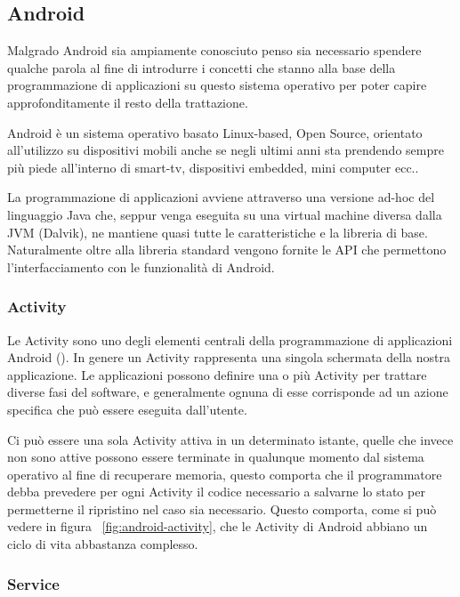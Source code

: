 \subsection{Android}

Malgrado Android sia ampiamente conosciuto penso sia necessario spendere qualche parola al fine di introdurre i concetti che stanno alla base della programmazione di applicazioni su questo sistema operativo per poter capire approfonditamente il resto della trattazione.

Android è un sistema operativo basato Linux-based, Open Source, orientato all'utilizzo su dispositivi mobili anche se negli ultimi anni sta prendendo sempre più piede all'interno di smart-tv, dispositivi embedded, mini computer ecc..

La programmazione di applicazioni avviene attraverso una versione ad-hoc del linguaggio Java che, seppur venga eseguita su una virtual machine diversa dalla JVM (Dalvik), ne mantiene quasi tutte le caratteristiche e la libreria di base. Naturalmente oltre alla libreria standard vengono fornite le API che permettono l'interfacciamento con le funzionalità di Android.

\subsubsection{Activity}

Le Activity sono uno degli elementi centrali della programmazione di applicazioni Android (\cite{html:android}). In genere un Activity rappresenta una singola schermata della nostra applicazione. Le applicazioni possono definire una o più Activity per trattare diverse fasi del software, e generalmente ognuna di esse corrisponde ad un azione specifica che può essere eseguita dall'utente. 

Ci può essere una sola Activity attiva in un determinato istante, quelle che invece non sono attive possono essere terminate in qualunque momento dal sistema operativo al fine di recuperare memoria, questo comporta che il programmatore debba prevedere per ogni Activity il codice necessario a salvarne lo stato per permetterne il ripristino nel caso sia necessario. Questo comporta, come si può vedere in figura ~\ref{fig:android-activity}, che le Activity di Android abbiano un ciclo di vita abbastanza complesso. 

\subsubsection{Service}

